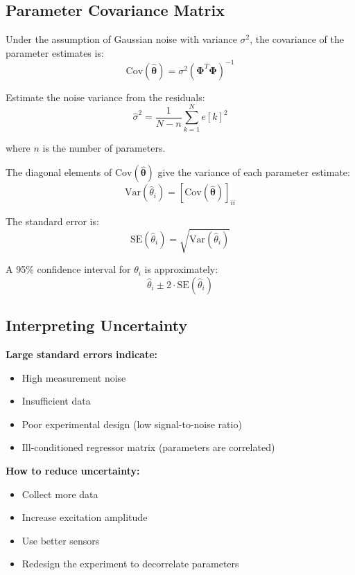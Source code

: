 \subsection{Parameter Covariance Matrix}

Under the assumption of Gaussian noise with variance $\sigma^2$, the covariance of the parameter estimates is:
\begin{equation}
\text{Cov}(\hat{\boldsymbol{\theta}}) = \sigma^2 (\mathbf{\Phi}^T\mathbf{\Phi})^{-1}
\end{equation}

Estimate the noise variance from the residuals:
\begin{equation}
\hat{\sigma}^2 = \frac{1}{N - n} \sum_{k=1}^N e[k]^2
\end{equation}

where $n$ is the number of parameters.

The diagonal elements of $\text{Cov}(\hat{\boldsymbol{\theta}})$ give the variance of each parameter estimate:
\begin{equation}
\text{Var}(\hat{\theta}_i) = [\text{Cov}(\hat{\boldsymbol{\theta}})]_{ii}
\end{equation}

The standard error is:
\begin{equation}
\text{SE}(\hat{\theta}_i) = \sqrt{\text{Var}(\hat{\theta}_i)}
\end{equation}

A 95\% confidence interval for $\theta_i$ is approximately:
\begin{equation}
\hat{\theta}_i \pm 2 \cdot \text{SE}(\hat{\theta}_i)
\end{equation}

\subsection{Interpreting Uncertainty}

\textbf{Large standard errors indicate:}
\begin{itemize}
    \item High measurement noise
    \item Insufficient data
    \item Poor experimental design (low signal-to-noise ratio)
    \item Ill-conditioned regressor matrix (parameters are correlated)
\end{itemize}

\textbf{How to reduce uncertainty:}
\begin{itemize}
    \item Collect more data
    \item Increase excitation amplitude
    \item Use better sensors
    \item Redesign the experiment to decorrelate parameters
\end{itemize}

